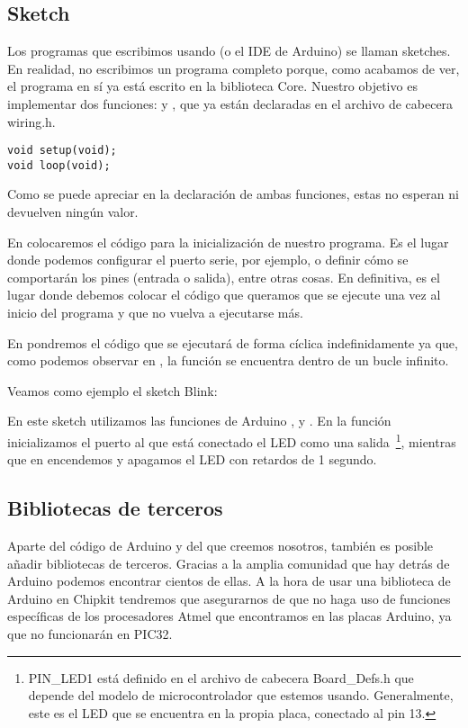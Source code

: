 \subsection{Sketch}
Los programas que escribimos usando  (o el IDE de Arduino) se llaman sketches. En realidad, no escribimos un programa completo porque, como acabamos de ver, el programa en sí ya está escrito en la biblioteca Core. Nuestro objetivo es implementar dos funciones:  y , que ya están declaradas en el archivo de cabecera wiring.h.

\begin{lstlisting}[caption=Sección de wiring.h]
void setup(void);
void loop(void);
\end{lstlisting}

Como se puede apreciar en la declaración de ambas funciones, estas no esperan ni devuelven ningún valor.


En  colocaremos el código para la inicialización de nuestro programa. Es el lugar donde podemos configurar el puerto serie, por ejemplo, o definir cómo se comportarán los pines (entrada o salida), entre otras cosas. En definitiva, es el lugar donde debemos colocar el código que queramos que se ejecute una vez al inicio del programa y que no vuelva a ejecutarse más.

En  pondremos el código que se ejecutará de forma cíclica indefinidamente ya que, como podemos observar en , la función  se encuentra dentro de un bucle infinito.

Veamos como ejemplo el sketch Blink:


En este sketch utilizamos las funciones de Arduino , y . En la función  inicializamos el puerto al que está conectado el LED como una salida~\protect\footnote{PIN\_LED1 está definido en el archivo de cabecera Board\_Defs.h que depende del modelo de microcontrolador que estemos usando. Generalmente, este es el LED que se encuentra en la propia placa, conectado al pin 13.}, mientras que en  encendemos y apagamos el LED con retardos de 1 segundo.

\subsection{Bibliotecas de terceros}
Aparte del código de Arduino y del que creemos nosotros, también es posible añadir bibliotecas de terceros. Gracias a la amplia comunidad que hay detrás de Arduino podemos encontrar cientos de ellas. A la hora de usar una biblioteca de Arduino en Chipkit tendremos que asegurarnos de que no haga uso de funciones específicas de los procesadores Atmel que encontramos en las placas Arduino, ya que no funcionarán en PIC32.

